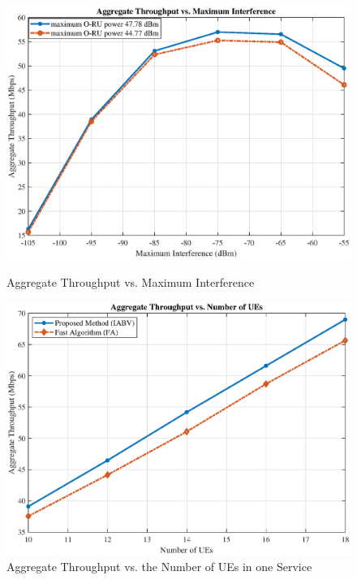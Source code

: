 \documentclass[lettersize,journal]{IEEEtran}
\begin{document}
\begin{figure}%
  \centering
  \captionsetup{justification=centering}
  \begin{minipage}[b]{0.4\textwidth}
   \includegraphics[scale = 0.3]{interF_new.eps}
  \caption{\small Aggregate Throughput vs. Maximum Interference }
  \label{fig:13}
  \end{minipage}
    \qquad
  \begin{minipage}[b]{0.4\textwidth}
    \includegraphics[scale = 0.3]{FA.eps}
  \caption{\small Aggregate Throughput vs. the Number of UEs in one Service }
  \label{fig:14}
  \end{minipage}
\end{figure}
\end{document}
